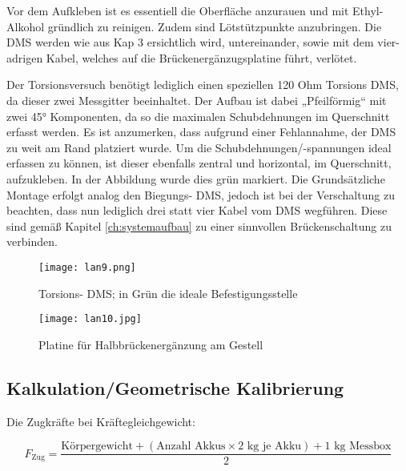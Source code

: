 Vor dem Aufkleben ist es essentiell die Oberfläche anzurauen und mit Ethyl- Alkohol gründlich zu reinigen. Zudem sind Lötstützpunkte anzubringen.
Die DMS werden wie aus Kap 3 ersichtlich wird, untereinander, sowie mit dem vier- adrigen Kabel, welches auf die Brückenergänzugsplatine führt, verlötet. 


Der Torsionsversuch benötigt lediglich einen speziellen 120 Ohm Torsions DMS, da dieser zwei Messgitter beeinhaltet.
Der Aufbau ist dabei „Pfeilförmig“ mit zwei 45° Komponenten, da so die maximalen Schubdehnungen im Querschnitt erfasst werden.
Es ist anzumerken, dass aufgrund einer Fehlannahme, der DMS zu weit am Rand platziert wurde.
Um die Schubdehnungen/-spannungen ideal erfassen zu können, ist dieser ebenfalls zentral und horizontal, im Querschnitt, aufzukleben.
In der Abbildung wurde dies grün markiert. Die Grundsätzliche Montage erfolgt analog den Biegungs- DMS, jedoch ist bei der Verschaltung zu beachten,
dass nun lediglich drei statt vier Kabel vom DMS wegführen. Diese sind gemäß Kapitel \ref{ch:systemaufbau} zu einer sinnvollen Brückenschaltung zu verbinden.  

\begin{figure}[htbp]
    \centering
    \begin{minipage}{0.48\textwidth}
        \centering
        \texttt{[image: lan9.png]}
        \caption[Torsions- DMS; in Grün die ideale Befestigungsstelle (Abbildungsverzeichnis)]{Torsions- DMS; in Grün die ideale Befestigungsstelle}
        
        \label{fig:lan9}
    \end{minipage}
    \hfill
    \begin{minipage}{0.48\textwidth}
        \centering
        \texttt{[image: lan10.jpg]}
        \caption[Platine für Halbbrückenergänzung am Gestell (Abbildungsverzeichnis)]{Platine für Halbbrückenergänzung am Gestell}
        
        \label{fig:lan10}
    \end{minipage}
\end{figure}

\clearpage
\subsection{Kalkulation/Geometrische Kalibrierung}
\label{sec:geo}
Die Zugkräfte bei Kräftegleichgewicht:

\begin{equation}
F_{\text{Zug}} = \frac{\text{Körpergewicht} + (\text{Anzahl Akkus} \times 2 \text{ kg je Akku}) + 1 \text{ kg Messbox}}{2}
\end{equation}

